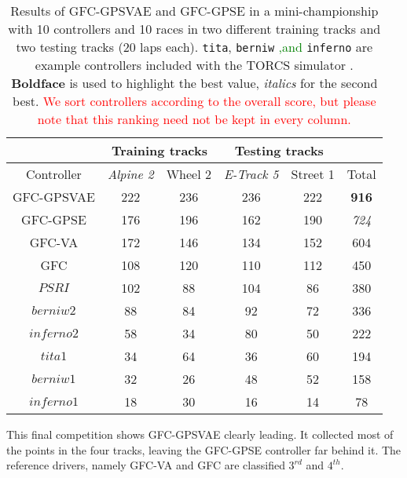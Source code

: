 \documentclass[10pt,journal,compsoc]{IEEEtran}
\begin{document}
\begin{table}[ht]
  \centering
  {\scriptsize
    \caption{ Results of {\sf GFC-GPSVAE} and {\sf GFC-GPSE}
      in a mini-championship with 10 controllers
      and 10 races in two different training tracks and two testing tracks (20 laps each). {\tt tita}, {\tt berniw} \textcolor{green}{,and} {\tt inferno} are example controllers included with the TORCS
      simulator \cite{torcs4}.  {\bf Boldface} is used to highlight
      the best value, {\em italics} for the second
      best. \textcolor{red}{We sort controllers according to the
        overall score, but please note that this ranking need not be
        kept in every column.}}
    {
            \begin{tabular}{|c|c|c|c|c||c|}
	\hline
	& \multicolumn{2}{|c|}{Training tracks} &\multicolumn{2}{|c|}{Testing tracks} \\
	\hline
	Controller&\textit{Alpine 2} &Wheel 2&\textit{E-Track 5}  &Street 1&Total\\
        \hline
        \hline



{\sf GFC-GPSVAE}	&222&236&236&222&	{\bf 916}\\
{\sf GFC-GPSE}	&176&196&162&190&{\em 724}\\

{\sf GFC-VA} \cite{DBLP:conf/cig/SalemMG19}&172&146&	134&152& 604\\
{\sf GFC}  \cite{salem_cig2018}	&108&	120&110&	112&	450\\
$PSRI$\cite{PerezEvolvingFuzzy09}&102&88 &104&86 &380\\
$berniw2$		&88	&84 &92 &72 &336\\
$inferno2$	&58	&34 &80 &50 &222\\
$tita1$		&34 &64 &36 &60 &194\\
$berniw1$		&32	&26 &48 &52 &158\\
$inferno1$	&18	&30 &16 &14 &78\\
\hline

\end{tabular}
}\label{tab:allsresults}
}
\end{table}




This final competition shows {\sf GFC-GPSVAE} clearly leading. It
collected most of the points in the four tracks, leaving the {\sf
  GFC-GPSE} controller far behind it. The reference drivers, namely
{\sf GFC-VA} and {\sf GFC}  are classified $3^{rd}$ and $4^{th}$.
\end{document}
